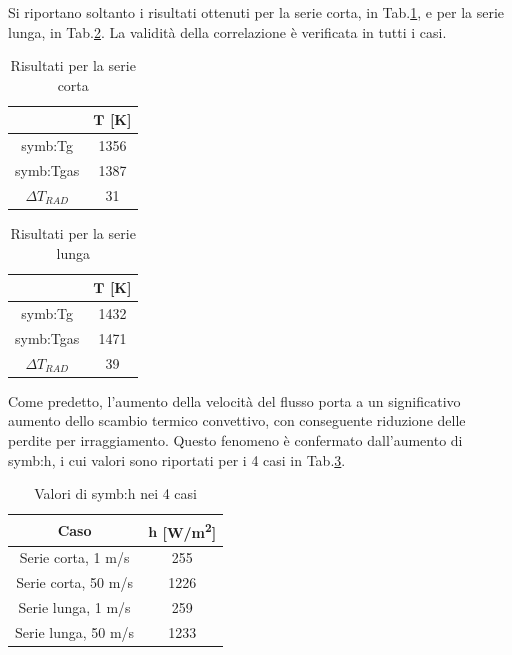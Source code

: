 Si riportano soltanto i risultati ottenuti per la serie corta, in Tab.\ref{tab:risultatishort50}, e per la serie lunga, in Tab.\ref{tab:risultatilong50}. La validità della correlazione è verificata in tutti i casi.  

\begin{table}[H]
	\centering
	\begin{tabular}{c|c}
		\toprule
		\toprule
		& $\bm{T}$ [K]\\
		\midrule
		\midrule
		\gls{symb:Tg} & 1356 \\
		\midrule
		\gls{symb:Tgas} & 1387 \\
		\midrule
		$\Delta T_{\textit{RAD}}$ & 31 \\
		\bottomrule
		\bottomrule	
	\end{tabular}
	\caption{Risultati per la serie corta}
	\label{tab:risultatishort50}
\end{table}

\begin{table}[H]
	\centering
	\begin{tabular}{c|c}
		\toprule
		\toprule
		& $\bm{T}$ [K]\\
		\midrule
		\midrule
		\gls{symb:Tg} & 1432 \\
		\midrule
		\gls{symb:Tgas} & 1471 \\
		\midrule
		$\Delta T_{\textit{RAD}}$ & 39 \\
		\bottomrule
		\bottomrule	
	\end{tabular}
	\caption{Risultati per la serie lunga}
	\label{tab:risultatilong50}
\end{table}

Come predetto, l'aumento della velocità del flusso porta a un significativo aumento dello scambio termico convettivo, con conseguente riduzione delle perdite per irraggiamento. Questo fenomeno è confermato dall'aumento di \gls{symb:h}, i cui valori sono riportati per i 4 casi in Tab.\ref{tab:risultatih}.

\begin{table}[H]
	\centering
	\begin{tabular}{c|c}
		\toprule
		\toprule
		\textbf{Caso}& $\bm{h}$  [W/m\textsuperscript{2}] \\
		\midrule
		\midrule
		Serie corta, 1 m/s & 255 \\
		\midrule
		Serie corta, 50 m/s & 1226 \\
		\midrule
		Serie lunga, 1 m/s & 259 \\
		\midrule
		Serie lunga, 50 m/s & 1233 \\
		\bottomrule
		\bottomrule	
	\end{tabular}
	\caption{Valori di \gls{symb:h} nei 4 casi}
	\label{tab:risultatih}
\end{table}

